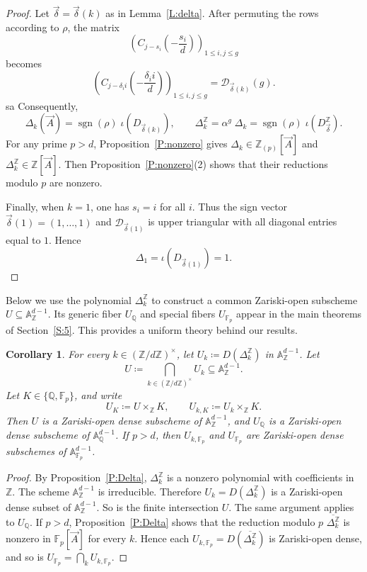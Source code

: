 \documentclass{amsart}
\theoremstyle{plain}
\newtheorem{corollary}[theorem]{Corollary}
\theoremstyle{remark}
\DeclareMathOperator{\sgn}{sgn}
\newcommand{\cD}{\mathcal{D}}
\renewcommand{\bar}{\overline}
\newcommand{\1}{\mathbf{1}}
\newcommand{\A}{\mathbb{A}}
\newcommand{\F}{\mathbb{F}}
\newcommand{\Q}{\mathbb{Q}}
\newcommand{\Z}{\mathbb{Z}}
\newcommand{\vA}{{\vec{A}}}
\newcommand{\bdelta}{{\vec\delta}}
\begin{document}
\begin{proof}
Let $\bdelta=\bdelta(k)$ as in Lemma~\ref{L:delta}.
After permuting the rows according to $\rho$, the matrix
\[
\left(C_{j-s_i}(-\frac{s_i}{d})\right)_{1\le i,j\le g}
\]
becomes
\[
\left(C_{j-\delta_i i}(-\frac{\delta_i i}{d})\right)_{1\le i,j\le g} = \cD_{\bdelta(k)}(g).
\]sa
Consequently,
\begin{equation*}
\Delta_k (\vA)
=\sgn(\rho)\; \iota(D_{\bdelta(k)}),
\qquad
\Delta_k^\Z
=\alpha^g \;\Delta_k
=\sgn(\rho)\; \iota(D_\bdelta^\Z).
\end{equation*}
For any prime $p>d$, Proposition~\ref{P:nonzero} gives
$\Delta_k \in\Z_{(p)}[\vA]$ and $\Delta_k^\Z\in\Z[\vA]$.
Then Proposition~\ref{P:nonzero}(2)
shows that their reductions modulo $p$ are nonzero.

Finally, when $k=1$, one has $s_i=i$ for all $i$. Thus
the sign vector $\bdelta(1)=(1,\ldots,1)$ and $\cD_{\bdelta(1)}$ is
upper triangular with all diagonal entries equal to $1$. Hence
$$\Delta_1=\iota(D_{\bdelta(1)})=1.$$
\end{proof}

Below we use the polynomial $\Delta_k^\Z$ to
construct a common Zariski-open subscheme $U\subseteq \A_\Z^{d-1}$.
Its generic fiber $U_\Q$ and special fibers $U_{\F_p}$
appear in the main theorems of Section~\ref{S:5}.
This provides a uniform theory behind our results.

\begin{corollary}\label{C:U}
For every $k\in (\Z/d\Z)^\times$, let $U_k\coloneqq
D(\Delta_k^\Z)$ in $\A_\Z^{d-1}$.
Let
\[
U\coloneqq \bigcap_{k\in(\Z/d\Z)^\times}U_k\subseteq \A_{\Z}^{d-1}.
\]
Let $K\in \{\Q, \F_p\}$, and write
\[
U_K\coloneqq U\times_\Z K, \qquad U_{k,K}\coloneqq U_k\times_\Z K.
\]
Then $U$ is a Zariski-open dense subscheme of $\A_\Z^{d-1}$,
and $U_\Q$ is a Zariski-open dense subscheme of
$\A_\Q^{d-1}$.
If $p>d$, then $U_{k,\F_p}$ and $U_{\F_p}$ are Zariski-open dense
subschemes of $\A_{\F_p}^{d-1}$.
\end{corollary}
\begin{proof}
By Proposition~\ref{P:Delta}, $\Delta_k^\Z$ is a nonzero polynomial
with coefficients in $\Z$.
The scheme $\A_\Z^{d-1}$ is irreducible.
Therefore $U_k=D(\Delta_k^\Z)$ is a Zariski-open dense subset of $\A_\Z^{d-1}$.
So is the finite intersection $U$.
The same argument applies to $U_\Q$.
If $p>d$, Proposition~\ref{P:Delta} shows that
the reduction modulo $p$ $\bar{\Delta_k^\Z}$ is nonzero in
$\F_p[\vA]$ for every $k$. Hence
each $U_{k,\F_p}=D(\bar{\Delta_k^\Z})$ is Zariski-open dense, and so is $U_{\F_p}=\bigcap_k U_{k,\F_p}$.
\end{proof}
	
\end{document}
